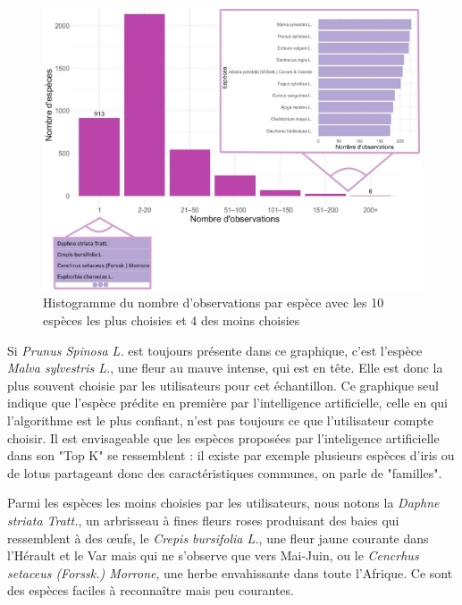\documentclass[a4paper,12pt]{article}
\begin{document}
\begin{figure}[H]
\centering
\includegraphics[width=\linewidth]{images/figure3.jpg}
\caption{Histogramme du nombre d'observations par espèce avec les 10 espèces les plus choisies et 4 des moins choisies}
\end{figure}

\vspace{0.2cm}

Si \textit{Prunus Spinosa L.} est toujours présente dans ce graphique, c'est l'espèce \textit{Malva sylvestris L.}, une fleur au mauve intense, qui est en tête. Elle est donc la plus souvent choisie par les utilisateurs pour cet échantillon. Ce graphique seul indique que l'espèce prédite en première par l'intelligence artificielle, celle en qui l'algorithme est le plus confiant, n'est pas toujours ce que l'utilisateur compte choisir. Il est envisageable que les espèces proposées par l'inteligence artificielle dans son "Top K" se ressemblent : il existe par exemple plusieurs espèces d'iris ou de lotus partageant donc des caractéristiques communes, on parle de "familles".

\vspace{0.2cm}

Parmi les espèces les moins choisies par les utilisateurs, nous notons la \textit{Daphne striata Tratt.}, un arbrisseau à fines fleurs roses produisant des baies qui ressemblent à des œufs, le \textit{Crepis bursifolia L.}, une fleur jaune courante dans l'Hérault et le Var mais qui ne s'observe que vers Mai-Juin, ou le \textit{Cencrhus setaceus (Forssk.) Morrone}, une herbe envahissante dans toute l'Afrique. Ce sont des espèces faciles à reconnaître mais peu courantes.
\end{document}
